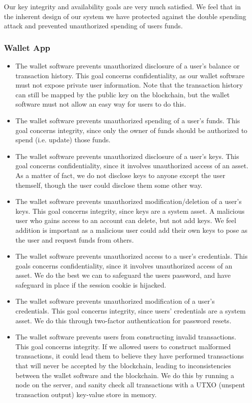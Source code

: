 \documentclass[12pt]{article}
\begin{document}
Our key integrity and availability goals are very much satisfied. We feel that in the inherent design of our system we have protected against the double spending attack and prevented unauthorized spending of users funds.

\subsubsection*{Wallet App}


\begin{itemize}
\item The wallet software prevents unauthorized disclosure of a user's balance or transaction history. This goal concerns confidentiality, as our wallet software must not expose private user information. Note that the transaction history can still be mapped by the public key on the blockchain, but the wallet software must not allow an easy way for users to do this.
\item The wallet software prevents unauthorized spending of a user's funds. This goal concerns integrity, since only the owner of funds should be authorized to spend (i.e. update) those funds.
\item The wallet software prevents unauthorized disclosure of a user's keys. This goal concerns confidentiality, since it involves unauthorized access of an asset. As a matter of fact, we do not disclose keys to anyone except the user themself, though the user could disclose them some other way.
\item The wallet software prevents unauthorized modification/deletion of a user's keys. This goal concerns integrity, since keys are a system asset. A malicious user who gains access to an account can delete, but not add keys. We feel addition is important as a malicious user could add their own keys to pose as the user and request funds from others.
\item The wallet software prevents unauthorized access to a user's credentials. This goals concerns confidentiality, since it involves unauthorized access of an asset. We do the best we can to safeguard the users password, and have safeguard in place if the session cookie is hijacked.
\item The wallet software prevents unauthorized modification of a user's credentials. This goal concerns integrity, since users' credentials are a system asset. We do this through two-factor authentication for password resets.
\item The wallet software prevents users from constructing invalid transactions. This goal concerns integrity. If we allowed users to construct malformed transactions, it could lead them to believe they have performed transactions that will never be accepted by the blockchain, leading to inconsistencies between the wallet software and the blockchain. We do this by running a node on the server, and sanity check all transactions with a UTXO (unspent transaction output) key-value store in memory.

\end{itemize}
\end{document}
